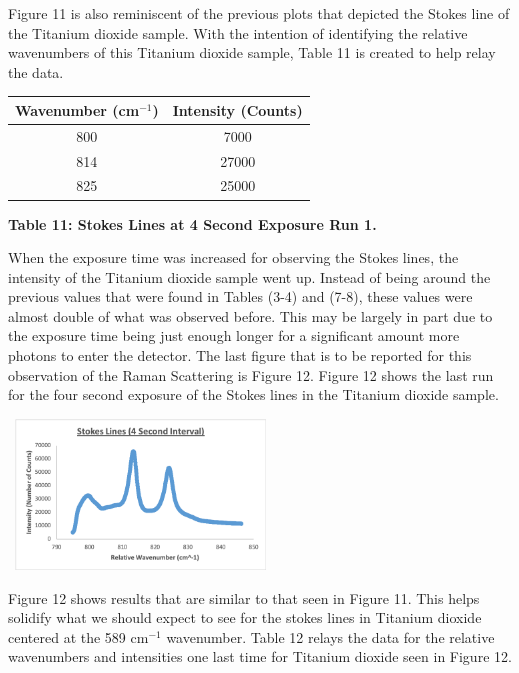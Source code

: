 \documentclass[]{article}
\begin{document}
\begin{multicols}{2}
\begin{center}
\end{center}
Figure 11 is also reminiscent of the previous plots that depicted the Stokes line of the Titanium dioxide sample. With the intention of identifying the relative wavenumbers of this Titanium dioxide sample, Table 11 is created to help relay the data. 
\newline
\begin{tabular}{|c|c|}
    \hline \textbf{Wavenumber (cm$^{-1}$)} & \textbf{Intensity (Counts)} \\ \hline
    800 & 7000 \\ \hline
    814 & 27000 \\ \hline
    825 & 25000 \\ \hline
\end{tabular}
\centerline{\tiny\textbf{{Table 11: Stokes Lines at 4 Second Exposure Run 1.}}}
\newline
When the exposure time was increased for observing the Stokes lines, the intensity of the Titanium dioxide sample went up. Instead of being around the previous values that were found in Tables (3-4) and (7-8), these values were almost double of what was observed before. This may be largely in part due to the exposure time being just enough longer for a significant amount more photons to enter the detector. The last figure that is to be reported for this observation of the Raman Scattering is Figure 12. Figure 12 shows the last run for the four second exposure of the Stokes lines in the Titanium dioxide sample.
\begin{center}
    \includegraphics[width=7cm, height=4cm]{PHYS 331 RS (4 Sec) 1b.png}
    \caption{\textbf{\small{Figure 12:} Stokes Lines at 4 Second Exposure Run 2.}}
\end{center}
Figure 12 shows results that are similar to that seen in Figure 11. This helps solidify what we should expect to see for the stokes lines in Titanium dioxide centered at the 589 cm$^{-1}$ wavenumber. Table 12 relays the data for the relative wavenumbers and intensities one last time for Titanium dioxide seen in Figure 12.

\end{multicols}
\end{document}
